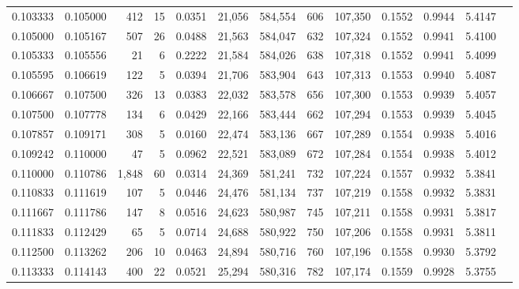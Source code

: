 \begin{tabular}{rrrrrrrrrrrrr}
0.103333 & 0.105000 &   412 &  15 &                                     0.0351 &  21,056 & 584,554 &     606 & 107,350 & 0.1552 & 0.9944 & 5.4147 \\
0.105000 & 0.105167 &   507 &  26 &                                     0.0488 &  21,563 & 584,047 &     632 & 107,324 & 0.1552 & 0.9941 & 5.4100 \\
0.105333 & 0.105556 &    21 &   6 &                                     0.2222 &  21,584 & 584,026 &     638 & 107,318 & 0.1552 & 0.9941 & 5.4099 \\
0.105595 & 0.106619 &   122 &   5 &                                     0.0394 &  21,706 & 583,904 &     643 & 107,313 & 0.1553 & 0.9940 & 5.4087 \\
0.106667 & 0.107500 &   326 &  13 &                                     0.0383 &  22,032 & 583,578 &     656 & 107,300 & 0.1553 & 0.9939 & 5.4057 \\
0.107500 & 0.107778 &   134 &   6 &                                     0.0429 &  22,166 & 583,444 &     662 & 107,294 & 0.1553 & 0.9939 & 5.4045 \\
0.107857 & 0.109171 &   308 &   5 &                                     0.0160 &  22,474 & 583,136 &     667 & 107,289 & 0.1554 & 0.9938 & 5.4016 \\
0.109242 & 0.110000 &    47 &   5 &                                     0.0962 &  22,521 & 583,089 &     672 & 107,284 & 0.1554 & 0.9938 & 5.4012 \\
0.110000 & 0.110786 & 1,848 &  60 &                                     0.0314 &  24,369 & 581,241 &     732 & 107,224 & 0.1557 & 0.9932 & 5.3841 \\
0.110833 & 0.111619 &   107 &   5 &                                     0.0446 &  24,476 & 581,134 &     737 & 107,219 & 0.1558 & 0.9932 & 5.3831 \\
0.111667 & 0.111786 &   147 &   8 &                                     0.0516 &  24,623 & 580,987 &     745 & 107,211 & 0.1558 & 0.9931 & 5.3817 \\
0.111833 & 0.112429 &    65 &   5 &                                     0.0714 &  24,688 & 580,922 &     750 & 107,206 & 0.1558 & 0.9931 & 5.3811 \\
0.112500 & 0.113262 &   206 &  10 &                                     0.0463 &  24,894 & 580,716 &     760 & 107,196 & 0.1558 & 0.9930 & 5.3792 \\
0.113333 & 0.114143 &   400 &  22 &                                     0.0521 &  25,294 & 580,316 &     782 & 107,174 & 0.1559 & 0.9928 & 5.3755 \\

\end{tabular}

